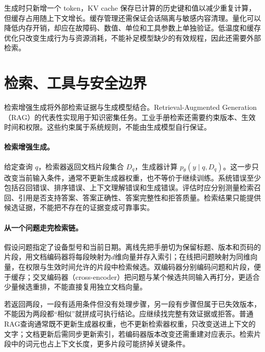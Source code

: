生成时只新增一个 token，KV cache 保存已计算的历史键和值以减少重复计算，但缓存占用随上下文增长。缓存管理还需保证会话隔离与敏感内容清理。量化可以降低内存开销，却应在故障码、数值、单位和工具参数上单独验证。低温度和缓存优化只改变生成行为与资源消耗，不能补足模型缺少的有效规程，因此还需要外部检索。

\section{检索、工具与安全边界}
检索增强生成将外部检索证据与生成模型结合。Retrieval-Augmented Generation（RAG）的代表性实现用于知识密集任务\cite{lewis2020rag}。工业手册检索还需要约束版本、生效时间和权限。这些约束属于系统规则，不能由生成模型自行保证。
\paragraph{检索增强生成。}
给定查询 $q$，检索器返回文档片段集合 $D_q$，生成器计算 $p_\theta(y\mid q,D_q)$。这一步只改变当前输入条件，通常不更新生成器权重，也不等价于继续训练。系统错误至少包括召回错误、排序错误、上下文理解错误和生成错误。评估时应分别测量检索召回、引用是否支持答案、答案正确性、答案完整性和拒答质量。检索结果只能提供候选证据，不能把不存在的证据变成可靠事实。

\paragraph{从一个问题走完检索链。}
假设问题指定了设备型号和当前日期。离线先把手册切为保留标题、版本和页码的片段，用文档编码器将每段映射为$d$维向量并存入索引；在线把问题映射为同维向量，在权限与生效时间允许的片段中检索候选。双编码器分别编码问题和片段，便于缓存；交叉编码器（cross-encoder）把问题与某个候选共同输入再打分，更适合少量候选重排，不能直接复用独立文档向量。

若返回两段，一段有适用条件但没有处理步骤，另一段有步骤但属于已失效版本，不能因为两段都“相似”就拼成可执行结论。应继续找完整有效证据或拒答。普通RAG查询通常既不更新生成器权重，也不更新检索器权重，只改变送进上下文的文字；文档更新后需同步更新索引，若编码器版本改变还需重建对应表示。检索片段中的词元也占上下文长度，更多片段可能挤掉关键条件。

